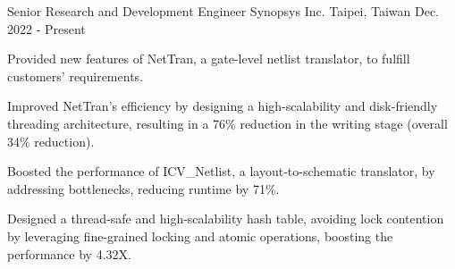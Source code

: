 

\begin{cventries}


  \cventry
    {Senior Research and Development Engineer} %
    {Synopsys Inc.} %
    {Taipei, Taiwan} %
    {Dec. 2022 - Present} %
    {
      \begin{cvitems} %
        \item {Provided new features of NetTran, a gate-level netlist translator, to fulfill customers' requirements.}
        \item {Improved NetTran's efficiency by designing a high-scalability and disk-friendly threading architecture, resulting in a 76\% reduction in the writing stage (overall 34\% reduction).}
        \item {Boosted the performance of ICV\_Netlist, a layout-to-schematic translator, by addressing bottlenecks, reducing runtime by 71\%.}
        \item {Designed a thread-safe and high-scalability hash table, avoiding lock contention by leveraging fine-grained locking and atomic operations, boosting the performance by 4.32X.}
      \end{cvitems}
    }


\end{cventries}
